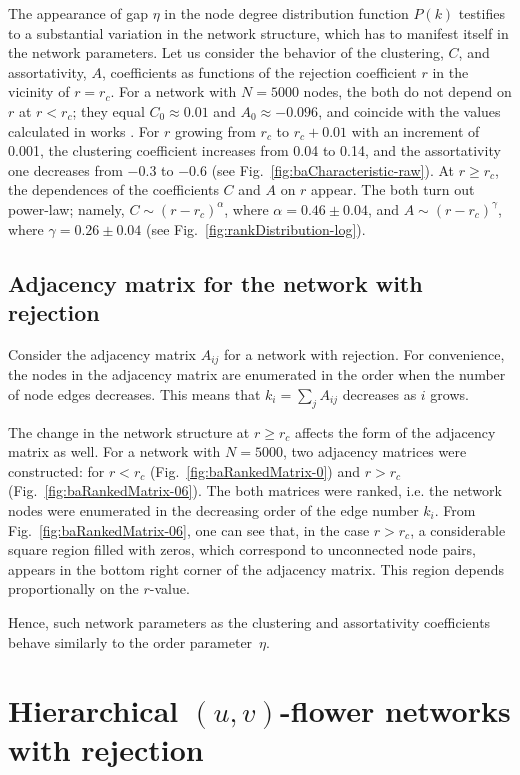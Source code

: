 \documentclass[aps,preprint]{revtex4}%
\begin{document}
The appearance of gap $\eta$ in the node degree distribution function $P(k)$
testifies to a substantial variation in the network structure, which has to
manifest itself in the network parameters. Let us consider the behavior of the
clustering, $C$, and assortativity, $A$, coefficients as functions of the
rejection coefficient $r$ in the vicinity of $r=r_{c}$. For a network with
$N=5000$ nodes, the both do not depend on $r$ at $r<r_{c}$; they equal
$C_{0}\approx0.01$ and $A_{0}\approx-0.096$, and coincide with the values
calculated in works \cite{AlBa2,Newman2}. For $r$ growing from $r_{c}$ to
$r_{c}+0.01$ with an increment of 0.001, the clustering coefficient increases
from 0.04 to 0.14, and the assortativity one decreases from $-0.3$ to $-0.6$
(see Fig.~\ref{fig:baCharacteristic-raw}). At $r\geq r_{c}$, the dependences
of the coefficients $C$ and $A$ on $r$ appear. The both turn out power-law;
namely, $C\sim{(r-r_{c})}^{\alpha}$, where $\alpha=0.46\pm0.04$, and
$A\sim{(r-r_{c})}^{\gamma}$, where $\gamma=0.26\pm0.04$ (see
Fig.~\ref{fig:rankDistribution-log}).

\subsection{Adjacency matrix for the network with rejection}

Consider the adjacency matrix $A_{ij}$ for a network with rejection. For
convenience, the nodes in the adjacency matrix are enumerated in the order
when the number of node edges decreases. This means that $k_{i}=\sum
\nolimits_{j}A_{ij}$ decreases as $i$ grows.

The change in the network structure at $r\geq r_{c}$ affects the form of the
adjacency matrix as well. For a network with $N=5000$, two adjacency matrices
were constructed: for $r<r_{c}$ (Fig.~\ref{fig:baRankedMatrix-0}) and
$r>r_{c}$ (Fig.~\ref{fig:baRankedMatrix-06}). The both matrices were ranked,
i.e. the network nodes were enumerated in the decreasing order of the edge
number $k_{i}$. From Fig.~\ref{fig:baRankedMatrix-06}, one can see that, in
the case $r>r_{c}$, a considerable square region filled with zeros, which
correspond to unconnected node pairs, appears in the bottom right corner of
the adjacency matrix. This region depends proportionally on the $r$-value.

Hence, such network parameters as the clustering and assortativity
coefficients behave similarly to the order parameter~$\eta$.

\section{Hierarchical $(u,v)$-flower networks with rejection}
\end{document}
